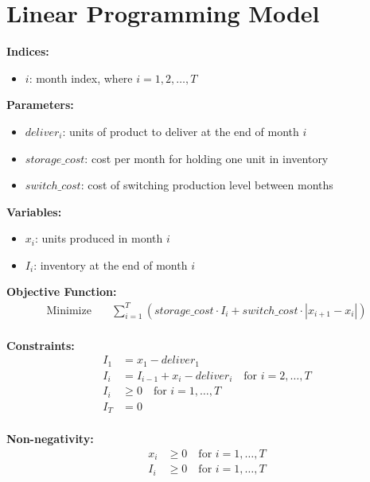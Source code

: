 \documentclass{article}
\begin{document}
\section*{Linear Programming Model}

\textbf{Indices:}
\begin{itemize}
    \item $i$: month index, where $i = 1, 2, \ldots, T$
\end{itemize}

\textbf{Parameters:}
\begin{itemize}
    \item $deliver_i$: units of product to deliver at the end of month $i$
    \item $storage\_cost$: cost per month for holding one unit in inventory
    \item $switch\_cost$: cost of switching production level between months
\end{itemize}

\textbf{Variables:}
\begin{itemize}
    \item $x_i$: units produced in month $i$
    \item $I_i$: inventory at the end of month $i$
\end{itemize}

\textbf{Objective Function:}
\begin{align*}
\text{Minimize} \quad & \sum_{i=1}^{T} (storage\_cost \cdot I_i + switch\_cost \cdot |x_{i+1} - x_i|) \\
\end{align*}

\textbf{Constraints:}
\begin{align*}
I_1 & = x_1 - deliver_1 \\
I_i & = I_{i-1} + x_i - deliver_i \quad \text{for } i = 2, \ldots, T \\
I_i & \geq 0 \quad \text{for } i = 1, \ldots, T \\
I_T & = 0 \\
\end{align*}

\textbf{Non-negativity:}
\begin{align*}
x_i & \geq 0 \quad \text{for } i = 1, \ldots, T \\
I_i & \geq 0 \quad \text{for } i = 1, \ldots, T \\
\end{align*}
\end{document}
